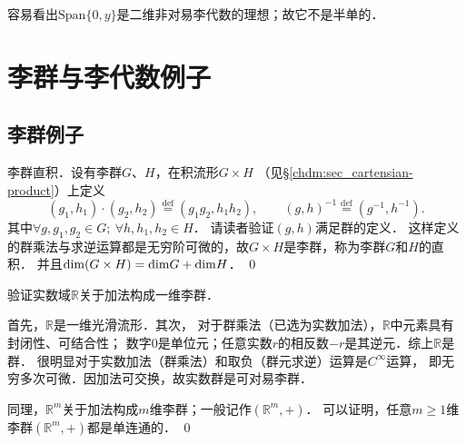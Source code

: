 容易看出${\mathrm{Span}}\{0, y\}$是二维非对易李代数的理想；故它不是半单的．




\section{李群与李代数例子}\label{chlg:sec_example}


\subsection{李群例子}


\begin{example}\label{chlg:exam_dir-prod}
	{\heiti 李群直积}．设有李群$G$、$H$，在积流形$G\times H$
	（见\S\ref{chdm:sec_cartensian-product}）上定义
	\begin{equation}
		(g_1,h_1)\cdot(g_2,h_2)\overset{\mathrm {def}}{=}(g_1 g_2, h_1h_2), \qquad
		(g,h)^{-1}\overset{\mathrm {def}}{=}(g^{-1},h^{-1}).
	\end{equation}
	其中$\forall g,g_1,g_2\in G;\ \forall h,h_1,h_2\in H$．
	请读者验证$(g,h)$满足群的定义．
	这样定义的群乘法与求逆运算都是无穷阶可微的，故$G\times H$是李群，称为李群$G$和$H$的直积．
	并且${\rm dim}(G\times H)={\rm dim}G+{\rm dim}H$． \qed
\end{example}


\begin{example}\label{chlg:exam_Rplus}
    验证实数域$\mathbb{R}$关于加法构成一维李群．
    
    首先，$\mathbb{R}$是一维光滑流形．其次，
    对于群乘法（已选为实数加法），$\mathbb{R}$中元素具有封闭性、可结合性；
    数字$0$是单位元；任意实数$r$的相反数$-r$是其逆元．综上$\mathbb{R}$是群．
    很明显对于实数加法（群乘法）和取负（群元求逆）运算是$C^\infty$运算，
    即无穷多次可微．因加法可交换，故实数群是可对易李群．
    
    同理，$\mathbb{R}^m$关于加法构成$m$维李群；一般记作$(\mathbb{R}^m,+)$． 
    可以证明，任意$m \geqslant 1$维李群$(\mathbb{R}^m,+)$都是{\kaishu 单连通}的． \qed
\end{example}



